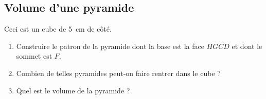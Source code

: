 
\subsection*{Volume d'une pyramide}

Ceci est un cube de \SI{5}{\centi\meter} de côté.
\begin{center}

\end{center}
\begin{enumerate}
    \item
        Construire le patron de la pyramide dont la base est la face \( HGCD\) et dont le sommet est \( F\).
    \item
        Combien de telles pyramides peut-on faire rentrer dans le cube ?
    \item
        Quel est le volume de la pyramide ?
\end{enumerate}
